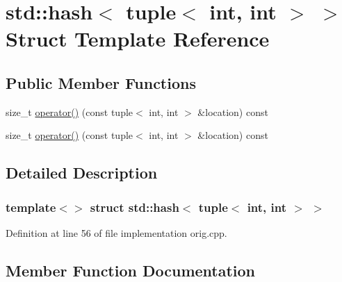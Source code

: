\hypertarget{structstd_1_1hash_3_01tuple_3_01int_00_01int_01_4_01_4}{}\section{std\+:\+:hash$<$ tuple$<$ int, int $>$ $>$ Struct Template Reference}
\label{structstd_1_1hash_3_01tuple_3_01int_00_01int_01_4_01_4}
\subsection*{Public Member Functions}
\begin{DoxyCompactItemize}
\item 
size\+\_\+t \hyperlink{structstd_1_1hash_3_01tuple_3_01int_00_01int_01_4_01_4_af46854ec2c5aa6cd6d1cd164374bd54f}{operator()} (const tuple$<$ int, int $>$ \&location) const
\item 
size\+\_\+t \hyperlink{structstd_1_1hash_3_01tuple_3_01int_00_01int_01_4_01_4_af46854ec2c5aa6cd6d1cd164374bd54f}{operator()} (const tuple$<$ int, int $>$ \&location) const
\end{DoxyCompactItemize}


\subsection{Detailed Description}
\subsubsection*{template$<$$>$\newline
struct std\+::hash$<$ tuple$<$ int, int $>$ $>$}



Definition at line 56 of file implementation orig.\+cpp.



\subsection{Member Function Documentation}
\mbox{\label{structstd_1_1hash_3_01tuple_3_01int_00_01int_01_4_01_4_af46854ec2c5aa6cd6d1cd164374bd54f}} 
